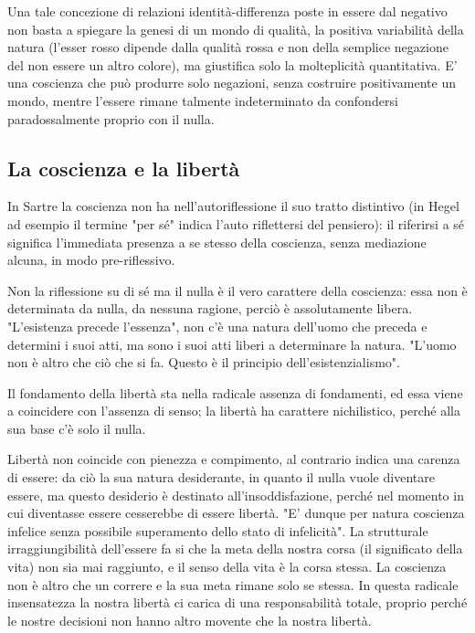 Una tale concezione di relazioni identità-differenza
poste in essere dal negativo non basta a spiegare
la genesi di un mondo di qualità, la positiva
variabilità della natura (l'esser rosso dipende
dalla qualità rossa e non della semplice negazione
del non essere un altro colore), ma giustifica
solo la molteplicità quantitativa. E' una coscienza
che può produrre solo negazioni, senza
costruire positivamente un mondo, mentre
l'essere rimane talmente indeterminato
da confondersi paradossalmente proprio con
il nulla.

\subsection{La coscienza e la libertà}

In Sartre la coscienza non ha nell'autoriflessione
il suo tratto distintivo (in Hegel ad esempio il termine
"per sé" indica l'auto riflettersi del pensiero): il
riferirsi a sé significa l'immediata presenza a se
stesso della coscienza, senza mediazione alcuna, in modo
pre-riflessivo.

Non la riflessione su di sé ma il nulla è il
vero carattere della coscienza: essa non è determinata
da nulla, da nessuna ragione, perciò è assolutamente libera.
"L'esistenza precede l'essenza", non c'è una natura
dell'uomo che preceda e determini i suoi atti, ma
sono i suoi atti liberi a determinare la natura.
"L'uomo non è altro che ciò che si fa. Questo è
il principio dell'esistenzialismo".

Il fondamento della libertà sta nella radicale
assenza di fondamenti, ed essa viene a coincidere
con l'assenza di senso; la libertà ha
carattere nichilistico, perché alla sua base
c'è solo il nulla.

Libertà non coincide con pienezza e compimento,
al contrario indica una carenza di essere: da ciò
la sua natura desiderante, in quanto il nulla vuole diventare
essere, ma questo desiderio è destinato all'insoddisfazione, perché nel momento in cui diventasse
essere cesserebbe di essere libertà. "E' dunque
per natura coscienza infelice senza possibile
superamento dello stato di infelicità".
La strutturale irraggiungibilità dell'essere fa si che
la meta della nostra corsa (il significato della vita)
non sia mai raggiunto, e il senso della vita
è la corsa stessa. La coscienza non è altro
che un correre e la sua meta rimane solo se
stessa.
In questa radicale insensatezza la nostra libertà
ci carica di una responsabilità totale, proprio
perché le nostre decisioni non hanno altro movente
che la nostra libertà. 

